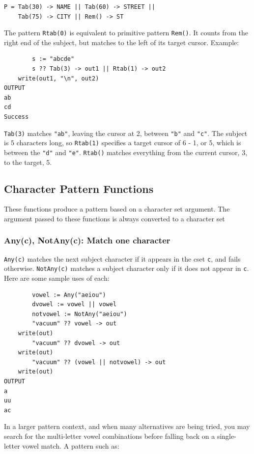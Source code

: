 \documentclass[letterpaper,12pt]{article}
\begin{document}
\begin{verbatim}
P = Tab(30) -> NAME || Tab(60) -> STREET || 
	Tab(75) -> CITY || Rem() -> ST
\end{verbatim}

The pattern {\tt Rtab(0)} is equivalent to primitive pattern {\tt Rem()}.
It counts from the right end of the subject, but matches to the left of
its target cursor. Example:

\begin{verbatim}
        s := "abcde"
        s ?? Tab(3) -> out1 || Rtab(1) -> out2
	write(out1, "\n", out2)
OUTPUT
ab
cd
Success
\end{verbatim}


{\tt Tab(3)} matches \texttt{"ab"}, leaving the cursor at 2, between
\texttt{"b"} and \texttt{"c"}. The subject is 5 characters long, so
{\tt Rtab(1)} specifies a target cursor of 6 - 1, or 5, which is between
the {\tt "d"} and {\tt "e"}.
{\tt Rtab()} matches everything from the current cursor,
3, to the target, 5.

\subsection{Character Pattern Functions}

These functions produce a pattern based on a character set
argument. The argument passed to these functions is always converted
to a character set

\subsubsection{Any(c), NotAny(c): Match one character}

{\tt Any(c)} matches the next subject character if it appears in the cset
{\tt c}, and fails otherwise. {\tt NotAny(c)} matches a subject
character only if it does not appear in {\tt c}. Here are some sample
uses of each:

\begin{verbatim}
        vowel := Any("aeiou")
        dvowel := vowel || vowel
        notvowel := NotAny("aeiou")
        "vacuum" ?? vowel -> out
	write(out)
        "vacuum" ?? dvowel -> out
	write(out)
        "vacuum" ?? (vowel || notvowel) -> out
	write(out)
OUTPUT
a
uu
ac
\end{verbatim}

In a larger pattern context, and when many alternatives are being
tried, you may search for the multi-letter vowel combinations before
falling back on a single-letter vowel match. A pattern such as:
\end{document}
